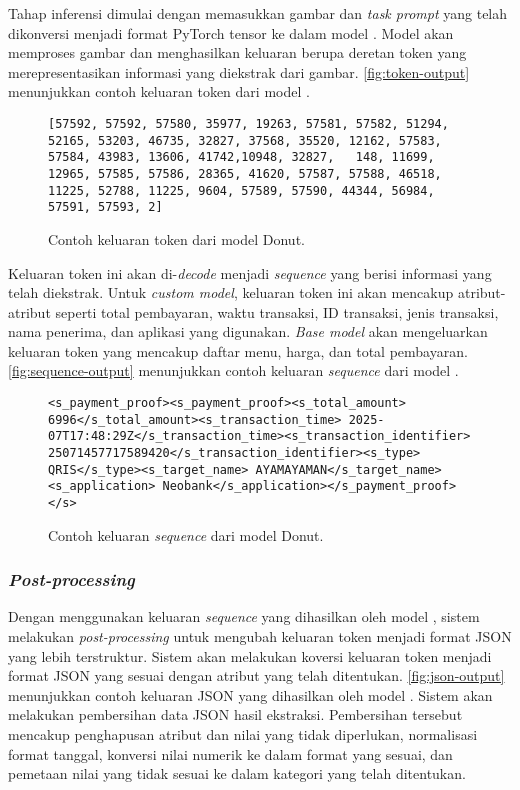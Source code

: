 Tahap inferensi dimulai dengan memasukkan gambar dan \emph{task prompt} yang telah dikonversi menjadi format PyTorch tensor ke dalam model \donut{}. Model akan memproses gambar dan menghasilkan keluaran berupa deretan token yang merepresentasikan informasi yang diekstrak dari gambar. \autoref{fig:token-output} menunjukkan contoh keluaran token dari model \donut.

\begin{figure}[htbp]
    \begin{lstlisting}[style=jsonstyle]
    [57592, 57592, 57580, 35977, 19263, 57581, 57582, 51294, 52165, 53203, 46735, 32827, 37568, 35520, 12162, 57583, 57584, 43983, 13606, 41742,10948, 32827,   148, 11699, 12965, 57585, 57586, 28365, 41620, 57587, 57588, 46518, 11225, 52788, 11225, 9604, 57589, 57590, 44344, 56984, 57591, 57593, 2]
    \end{lstlisting}
    \caption{Contoh keluaran token dari model Donut.}
    \label{fig:token-output}
\end{figure}

Keluaran token ini akan di-\emph{decode} menjadi \emph{sequence} yang berisi informasi yang telah diekstrak. Untuk \emph{custom model}, keluaran token ini akan mencakup atribut-atribut seperti total pembayaran, waktu transaksi, ID transaksi, jenis transaksi, nama penerima, dan aplikasi yang digunakan. \emph{Base model} akan mengeluarkan keluaran token yang mencakup daftar menu, harga, dan total pembayaran. \autoref{fig:sequence-output} menunjukkan contoh keluaran \emph{sequence} dari model \donut.
\begin{figure}[htbp]
    \begin{lstlisting}[style=jsonstyle]
    <s_payment_proof><s_payment_proof><s_total_amount> 6996</s_total_amount><s_transaction_time> 2025-07T17:48:29Z</s_transaction_time><s_transaction_identifier> 25071457717589420</s_transaction_identifier><s_type> QRIS</s_type><s_target_name> AYAMAYAMAN</s_target_name><s_application> Neobank</s_application></s_payment_proof></s>
    \end{lstlisting}
    \caption{Contoh keluaran \emph{sequence} dari model Donut.}
    \label{fig:sequence-output}
\end{figure}

\subsubsection{\emph{Post-processing}}
\label{subsec:post-processing}
Dengan menggunakan keluaran \emph{sequence} yang dihasilkan oleh model \donut{}, sistem melakukan \emph{post-processing} untuk mengubah keluaran token menjadi format JSON yang lebih terstruktur. Sistem akan melakukan koversi keluaran token menjadi format JSON yang sesuai dengan atribut yang telah ditentukan. \autoref{fig:json-output} menunjukkan contoh keluaran JSON yang dihasilkan oleh model \donut{}. Sistem akan melakukan pembersihan data JSON hasil ekstraksi. Pembersihan tersebut mencakup penghapusan atribut dan nilai yang tidak diperlukan, normalisasi format tanggal, konversi nilai numerik ke dalam format yang sesuai, dan pemetaan nilai yang tidak sesuai ke dalam kategori yang telah ditentukan.

